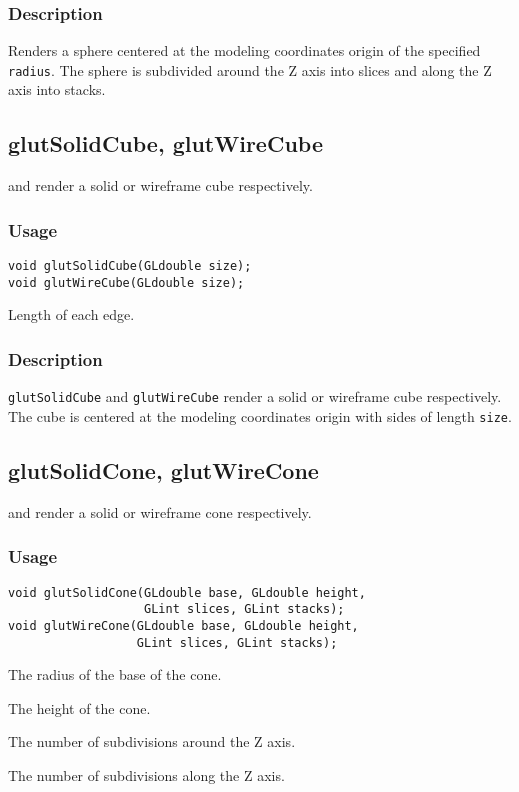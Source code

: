 \subsubsection*{Description}

Renders a sphere centered at the modeling coordinates origin of the specified {\tt radius}.
The sphere is subdivided around the Z axis into slices and along the Z
axis into stacks.

\subsection{glutSolidCube, glutWireCube}

 and  render a solid or wireframe
cube respectively.

\subsubsection*{Usage}
\begin{verbatim}
void glutSolidCube(GLdouble size);
void glutWireCube(GLdouble size);
\end{verbatim}
\begin{description}
\itemsep 0in
\item[{\tt size}]
Length of each edge.
\end{description}

\subsubsection*{Description}

{\tt glutSolidCube} and {\tt glutWireCube} render a solid or wireframe
cube respectively.
The cube is centered at the modeling coordinates origin with sides of length {\tt size}.

\subsection{glutSolidCone, glutWireCone}

 and  render a solid or wireframe
cone respectively.

\subsubsection*{Usage}
\begin{verbatim}
void glutSolidCone(GLdouble base, GLdouble height,
                   GLint slices, GLint stacks);
void glutWireCone(GLdouble base, GLdouble height,
                  GLint slices, GLint stacks);
\end{verbatim}
\begin{description}
\itemsep 0in
\item[{\tt base}]
The radius of the base of the cone.
\item[{\tt height}]
The height of the cone.
\item[{\tt slices}]
The number of subdivisions around the Z axis.
\item[{\tt stacks}]
The number of subdivisions along the Z axis.
\end{description}

